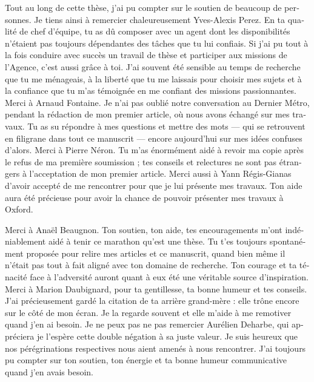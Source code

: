 \begin{otherlanguage}{french}
  Tout au long de cette thèse, j’ai pu compter sur le soutien de beaucoup de
  personnes. Je tiens ainsi à remercier chaleureusement Yves-Alexis Perez. En ta
  qualité de chef d’équipe, tu as dû composer avec un agent dont les
  disponibilités n’étaient pas toujours dépendantes des tâches que tu lui
  confiais. Si j’ai pu tout à la fois conduire avec succès un travail de thèse
  et participer aux missions de l’Agence, c’est aussi grâce à toi. J’ai souvent
  été sensible au temps de recherche que tu me ménageais, à la liberté que tu me
  laissais pour choisir mes sujets et à la confiance que tu m’as témoignée en me
  confiant des missions passionnantes.
  Merci à Arnaud Fontaine. Je n’ai pas oublié notre conversation au Dernier
  Métro, pendant la rédaction de mon premier article, où nous avons échangé sur
  mes travaux. Tu as su répondre à mes questions et mettre des mots --- qui se
  retrouvent en filigrane dans tout ce manuscrit --- encore aujourd’hui sur mes
  idées confuses d’alors.
  Merci à Pierre Néron. Tu m’as énormément aidé à revoir ma copie après le refus
  de ma première soumission ; tes conseils et relectures ne sont pas étrangers à
  l’acceptation de mon premier article.
  Merci aussi à Yann Régis-Gianas d’avoir accepté de me rencontrer pour que je
  lui présente mes travaux. Ton aide aura été précieuse pour avoir la chance de
  pouvoir présenter mes travaux à Oxford.

  Merci à Anaël Beaugnon. Ton soutien, ton aide, tes encouragements m’ont
  indéniablement aidé à tenir ce marathon qu'est une thèse. Tu t’es toujours
  spontanément proposée pour relire mes articles et ce manuscrit, quand bien
  même il n’était pas tout à fait aligné avec ton domaine de recherche. Ton
  courage et ta ténacité face à l’adversité auront quant à eux été une véritable
  source d’inspiration.
  Merci à Marion Daubignard, pour ta gentillesse, ta bonne humeur et tes
  conseils. J’ai précieusement gardé la citation de ta arrière grand-mère : elle
  trône encore sur le côté de mon écran. Je la regarde souvent et elle m’aide à
  me remotiver quand j’en ai besoin.
  Je ne peux pas ne pas remercier Aurélien Deharbe, qui appréciera je l’espère
  cette double négation à sa juste valeur. Je suis heureux que nos
  pérégrinations respectives nous aient amenés à nous rencontrer. J’ai toujours
  pu compter sur ton soutien, ton énergie et ta bonne humeur communicative quand
  j’en avais besoin.


\end{otherlanguage}
